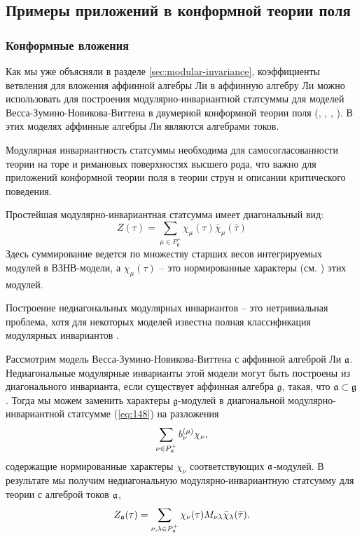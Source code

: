 \subsection{Примеры приложений в конформной теории поля}
\label{sec:phys-appl}

\subsubsection{Конформные вложения}
\label{sec:conformal-embeddings}

Как мы уже объясняли в разделе \ref{sec:modular-invariance}, коэффициенты ветвления для вложения аффинной алгебры Ли в аффинную алгебру Ли можно использовать для построения модулярно-инвариантной статсуммы для моделей Весса-Зумино-Новикова-Виттена в двумерной конформной теории поля (\cite{difrancesco1997cft}, \cite{Walton:1999xc}, \cite{walton1989conformal}, \cite{schellekens1986conformal}).
В этих моделях аффинные алгебры Ли являются алгебрами токов. 

Модулярная инвариантность статсуммы необходима для самосогласованности теории на торе и римановых поверхностях высшего рода, что важно для приложений конформной теории поля в теории струн и описании критического поведения.

Простейшая модулярно-инвариантная статсумма имеет диагональный вид:
\begin{equation}
  \label{eq:148}
   Z(\tau)=\sum_{ \mu\in P^{+}_{\mathfrak{g}}} \chi_{\mu}(\tau)\bar \chi_{\mu}(\bar \tau)
\end{equation}
Здесь суммирование ведется по множеству старших весов интегрируемых модулей в ВЗНВ-модели, а $\chi_{\mu}(\tau)$ -- это нормированные характеры (см. \cite{difrancesco1997cft}) этих модулей.

Построение недиагональных модулярных инвариантов -- это нетривиальная проблема, хотя для некоторых моделей известна полная классификация модулярных инвариантов \cite{1994hepthGannon,1995JMPGannon}.

Рассмотрим модель Весса-Зумино-Новикова-Виттена с аффинной алгеброй Ли $\mathfrak{a}$. Недиагональные модулярные инварианты этой модели могут быть построены из диагонального инварианта, если существует аффинная алгебра  $\mathfrak{g}$, такая, что $\mathfrak{a}\subset\mathfrak{g}$. Тогда мы можем заменить характеры  $\mathfrak{g}$-модулей в диагональной модулярно-инвариантной статсумме (\ref{eq:148}) на разложения
\begin{equation*}
  \label{eq:32}
\sum_{\nu \in P^{+}_{\mathfrak{a}}}b^{(\mu)}_{\nu} \chi_{\nu},
\end{equation*}
содержащие нормированные характеры $\chi_{\nu}$ соответствующих $\mathfrak{a}$-модулей. В результате мы получим недиагональную модулярно-инвариантную статсумму для теории с алгеброй токов $\mathfrak{a}$,
\begin{equation}
  \label{eq:154}
   Z_{\mathfrak{a}}(\tau)=\sum_{ \nu,\lambda\in P^{+}_{\mathfrak{a}}} \chi_{\nu}(\tau)M_{\nu\lambda}\bar \chi_{\lambda}(\bar \tau).
\end{equation}

